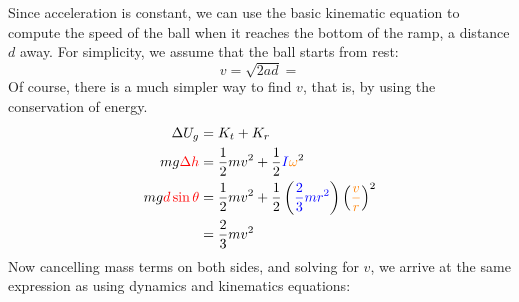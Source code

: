 \documentclass[11pt]{article}
\begin{document}
Since acceleration is constant, we can use the basic kinematic equation to
compute the speed of the ball when it reaches the bottom of the ramp, a
distance $d$ away. For simplicity, we assume that the ball starts from rest:
\begin{equation}
  v=\sqrt{2ad}=
\end{equation}
Of course, there is a much simpler way to find $v$, that is, by using the
conservation of energy.
\begin{align*}
  \Delta U_g&=K_t+K_r\\
  mg\textcolor{red}{\Delta h}&=\frac12 mv^2+
  \frac12
  \textcolor{blue}{I}\textcolor{orange}{\omega}^2\\
  mg\textcolor{red}{d\sin\theta}&=\frac12 mv^2+\frac12
  \left(\textcolor{blue}{\frac23 mr^2}\right)
  \left(\textcolor{orange}{\frac{v}{r}}\right)^2\\
  &=\frac23mv^2
\end{align*}
Now cancelling mass terms on both sides, and solving for $v$, we arrive at the
same expression as using dynamics and kinematics equations:
\end{document}
